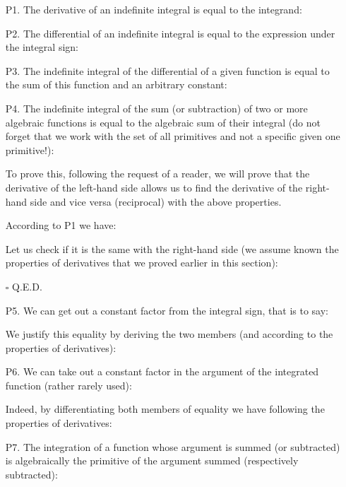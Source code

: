 	\begin{enumerate}
		\item[P1.] The derivative of an indefinite integral is equal to the integrand:
		
		\item[P2.] The differential of an indefinite integral is equal to the expression under the integral sign:
		
		\item[P3.] The indefinite integral of the differential of a given function is equal to the sum of this function and an arbitrary constant:
		
		\item[P4.] The indefinite integral of the sum (or subtraction) of two or more algebraic functions is equal to the algebraic sum of their integral (do not forget that we work with the set of all primitives and not a specific given one primitive!):
		
		\begin{dem}
		To prove this, following the request of a reader, we will prove that the derivative of the left-hand side allows us to find the derivative of the right-hand side and vice versa (reciprocal) with the above properties.
		
		According to P1 we have:
				
		Let us check if it is the same with the right-hand side (we assume known the properties of derivatives that we proved earlier in this section):
		
		\end{dem} 
		\begin{flushright}
			$\square$  Q.E.D.
		\end{flushright}
		\item [P5.] We can get out a constant factor from the integral sign, that is to say:
		
		We justify this equality by deriving the two members (and according to the properties of derivatives):
		
		\item[P6.] We can take out a constant factor in the argument of the integrated function (rather rarely used):
		
		Indeed, by differentiating both members of equality we have following the properties of derivatives:
		
		\item[P7.] The integration of a function whose argument is summed (or subtracted) is algebraically the primitive of the argument summed (respectively subtracted):
		

\end{enumerate}
